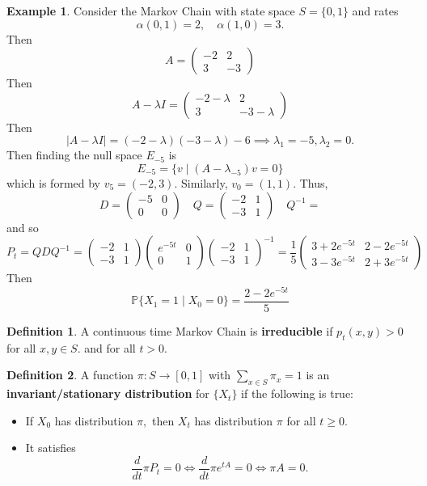 \documentclass[10pt, oneside]{article}
\newcommand{\bbP}{\mathbb{P}}
\theoremstyle{definition}
\newtheorem{exmp}{Example}[section]
\newtheorem{defn}{Definition}
\begin{document}
\begin{exmp}
    Consider the Markov Chain with state space $S = \{0,1\}$ and rates 
    \[\alpha(0,1) = 2, \quad \alpha(1,0) = 3.\]
    Then 
    \[A = \begin{pmatrix}
        -2 & 2\\
        3 & -3
    \end{pmatrix}\] Then 
    \[A - \lambda I =  \begin{pmatrix}
        -2 - \lambda & 2  \\
        3   & -3 - \lambda
    \end{pmatrix}\] Then 
    \[|A - \lambda I | = (-2 - \lambda)(-3 - \lambda) - 6 \implies \lambda_1 = -5, \lambda_2 = 0.\] Then finding the null space $E_{-5}$ is 
    \[E_{-5} = \{v \mid (A - \lambda_{-5})v = 0\}\] which is formed by $v_5= (-2,3).$ Similarly, $v_0 = (1,1).$ Thus, 
    \[D = \begin{pmatrix}
        -5 & 0\\
        0 & 0
    \end{pmatrix}\quad Q = \begin{pmatrix}
        -2 & 1 \\
        -3 & 1
    \end{pmatrix} \quad Q^{-1} = \] and so 
    \[P_t = QDQ^{-1}= \begin{pmatrix}
        -2 & 1 \\
        -3 & 1
    \end{pmatrix} \begin{pmatrix}
        e^{-5t} & 0\\
        0 & 1
    \end{pmatrix}\begin{pmatrix}
        -2 & 1 \\
        -3 & 1
    \end{pmatrix}^{-1} = \frac{1}{5}\begin{pmatrix}
        3 + 2e^{-5t} & 2- 2e^{-5t}\\
        3 - 3e^{-5t} & 2 + 3e^{-5t}
    \end{pmatrix}\]
    Then 
    \[\bbP\{X_1 = 1 \mid X_0 = 0\} = \frac{2 - 2e^{-5t}}{5}\]
\end{exmp}

\begin{defn}
    A continuous time Markov Chain is \textbf{irreducible} if $p_t(x,y) >0$ for all $x,y \in S.$ and for all $t>0.$
\end{defn}
\begin{defn}
    A function $\pi: S \to [0,1]$ with $\sum_{x \in S}\pi_x = 1$ is an \textbf{invariant/stationary distribution} for $\{X_t\}$ if the following is true:
    \begin{itemize}
        \item If $X_0$ has distribution $\pi,$ then $X_t$ has distribution $\pi$ for all $t\geq 0.$
        \item It satisfies \[\frac{d}{dt}\pi P_t = 0 \iff \frac{d}{dt}\pi e^{tA} = 0 \iff \pi A = 0.\]
    \end{itemize}
\end{defn}
\end{document}
